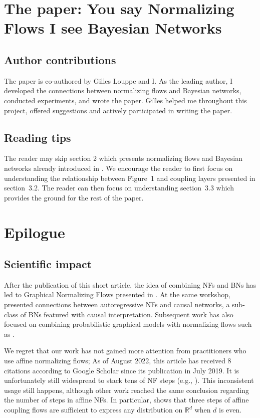 \vfill

\section{The paper: You say Normalizing Flows I see Bayesian Networks}

\subsection{Author contributions}
The paper is co-authored by Gilles Louppe and I. As the leading author, I developed the connections between normalizing flows and Bayesian networks, conducted experiments, and wrote the paper. Gilles helped me throughout this project, offered suggestions and actively participated in writing the paper.

\subsection{Reading tips}
The reader may skip section 2 which presents normalizing flows and Bayesian networks already introduced in . We encourage the reader to first focus on understanding the relationship between Figure~1 and coupling layers presented in section~3.2. The reader can then focus on understanding section~3.3 which provides the ground for the rest of the paper.


\section{Epilogue}
\subsection{Scientific impact}
After the publication of this short article, the idea of combining NFs and BNs has led to Graphical Normalizing Flows presented in . At the same workshop, \citet{khemakhem_causal_2020} presented connections between autoregressive NFs and causal networks, a sub-class of BNs featured with causal interpretation. Subsequent work has also focused on combining probabilistic graphical models with normalizing flows such as \citet{mouton2022graphical, mouton2022siren}.

We regret that our work has not gained more attention from practitioners who use affine normalizing flows; As of August 2022, this article has received $8$ citations according to Google Scholar since its publication in July 2019. It is unfortunately still widespread to stack tens of NF steps (e.g., \citep{daxamortized}). This inconsistent usage still happens, although other work reached the same conclusion regarding the number of steps in affine NFs. In particular, \citet{koehler2021representational} shows that three steps of affine coupling flows are sufficient to express any distribution on $\mathbb{R}^d$ when $d$ is even.

